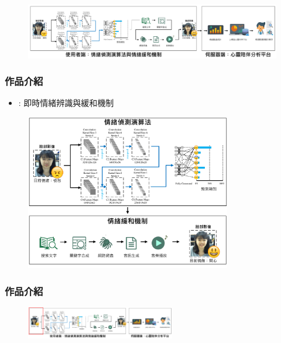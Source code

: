 \documentclass[10pt, conference, compsocconf]{beamer}
\begin{document}
\begin{CJK}{UTF8}{}
\begin{frame}
\begin{figure}[!t]
\begin{center}
\includegraphics[width=12cm]{./Figures/framework_version4.pdf}
\end{center}
\end{figure}

\end{frame}

\begin{frame}
\frametitle{作品介紹}
\begin{itemize}
\item {} : 即時情緒辨識與緩和機制
\end{itemize}

\begin{figure}[!t]
\begin{center}
\includegraphics[width=9cm]{./Figures/framework_vertical.pdf}
\end{center}
\end{figure}

\end{frame}

\begin{frame}
\frametitle{作品介紹}
\begin{figure}[t]
\begin{flushright}
\vspace{-9mm}
\includegraphics[width=6.5cm]{./Figures/framework_version4_1.pdf}
\end{flushright}
\end{figure}


\end{frame}
\end{CJK}
\end{document}
